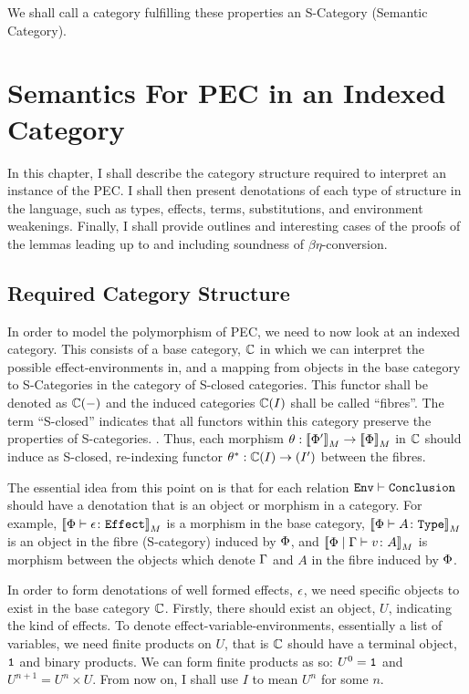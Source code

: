 \documentclass{Report}
\begin{document}
We shall call a category fulfilling these properties an S-Category (Semantic Category).


\chapter{Semantics For PEC in an Indexed Category}
In this chapter, I shall describe the category structure required to interpret an instance of the PEC. I shall then present denotations of each type of structure in the language, such as types, effects, terms, substitutions, and environment weakenings. Finally, I shall provide outlines and interesting cases of the proofs of the lemmas leading up to and including soundness of $\beta\eta$-conversion.


\section{Required Category Structure}
In order to model the polymorphism of PEC, we need to now look at an indexed category. This consists of a base category, $\C$ in which we can interpret the possible effect-environments in, and a mapping from objects in the base category to S-Categories in the category of S-closed categories. This functor shall be denoted as $\C(-)$ and the induced categories $\C(I)$ shall be called ``fibres''. The term ``S-closed'' indicates that all functors within this category preserve the properties of S-categories. . Thus, each morphism $\theta: \deno{\P'}\rightarrow\deno{\P}$ in $\C$ should induce as S-closed, re-indexing functor $\theta\star: \C(I)\rightarrow(I')$ between the fibres.

The essential idea from this point on is that for each relation $\wellformed{\texttt{Env}}{\texttt{Conclusion}}$ should have a denotation that is an object or morphism in a category. For example, $\deno{\typerelation{\P}{\e}{\effect}}$ is a morphism in the base category, $\deno{\typerelation{\P}{A}{\type}}$ is an object in the fibre (S-category) induced by $\P$, and $\deno{\gpetyperelation{v}{A}}$ is morphism between the objects which denote $\G$ and $A$ in the fibre induced by $\P$.

In order to form denotations of well formed effects, $\e$, we need specific objects to exist in the base category $\C$. Firstly, there should exist an object, $U$, indicating the kind of effects. To denote effect-variable-environments, essentially a list of variables, we need finite products on $U$, that is $\C$ should have a terminal object, $\1$ and binary products. We can form finite products as so: $U^0 = \1$ and $U^{n+1} = U^n\times U$. From now on, I shall use $I$ to mean $U^n$ for some $n$.
\end{document}
